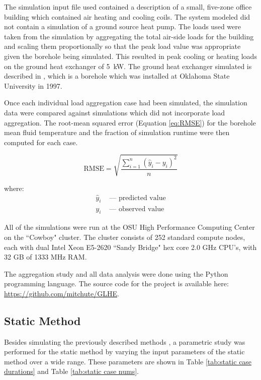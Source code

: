 \documentclass[review,12pt]{elsarticle}
\begin{document}
The simulation input file used contained a description of a small, five-zone office building which contained air heating and cooling coils. The system modeled did not contain a simulation of a ground source heat pump. The loads used were taken from the simulation by aggregating the total air-side loads for the building and scaling them proportionally so that the peak load value was appropriate given the borehole being simulated. This resulted in peak cooling or heating loads on the ground heat exchanger of \SI{5}{\kilo\watt}. The ground heat exchanger simulated is described in \cite{BEIER201855}, which is a borehole which was installed at Oklahoma State University in 1997.

Once each individual load aggregation case had been simulated, the simulation data were compared against simulations which did not incorporate load aggregation. The root-mean squared error (Equation \ref{eq:RMSE}) for the borehole mean fluid temperature and the fraction of simulation runtime were then computed for each case.

\begin{equation}
    \mbox{RMSE} = \sqrt{\frac{\sum_{i=1}^n \left(\hat{y}_i - y_i\right)^2}{n}}
    \label{eq:RMSE}
\end{equation}

where:
\begin{align*}
    \hat{y}_i & \mbox{ --- predicted value} \\
    y_i & \mbox{ --- observed value}
\end{align*}

All of the simulations were run at the OSU High Performance Computing Center on the ``Cowboy" cluster. The cluster consists of 252 standard compute nodes, each with dual Intel Xeon E5-2620 ``Sandy Bridge" hex core 2.0 GHz CPU's, with 32 GB of 1333 MHz RAM.

The aggregation study and all data analysis were done using the Python programming language. The source code for the project is available here: \url{https://github.com/mitchute/GLHE}.

\subsection{Static Method}
\label{subsec:agg:method:static}

Besides simulating the previously described methods \citep{YavuzturkSpitler1999, BernierPinelLabibPaillot2004, Liu2005}, a parametric study was performed for the static method by varying the input parameters of the static method over a wide range. These parameters are shown in Table \ref{tab:static case durations} and Table \ref{tab:static case nums}.
\end{document}
